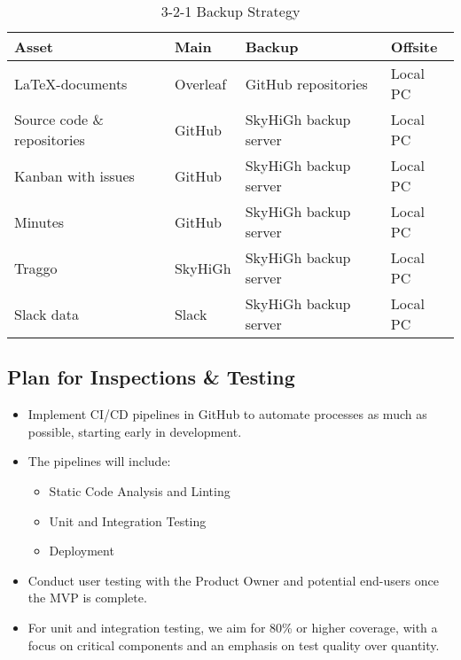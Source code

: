 \begin{table} [H]
    \centering
    \begin{tabular}{|l|l|l|l|}
    \hline
    Asset & Main & Backup & Offsite \\
    \hline
    \LaTeX-documents & Overleaf & GitHub repositories & Local PC \\
    Source code \& repositories & GitHub & SkyHiGh backup server & Local PC \\
    Kanban with issues & GitHub & SkyHiGh backup server & Local PC \\
    Minutes & GitHub & SkyHiGh backup server & Local PC \\
    Traggo & SkyHiGh & SkyHiGh backup server & Local PC \\
    Slack data & Slack & SkyHiGh backup server & Local PC \\
    \hline
    \end{tabular}
    \caption{3-2-1 Backup Strategy}
    \label{tab:tools}
\end{table}


\subsection{Plan for Inspections \& Testing}\label{sec:plan_for_inspections_&_testing}

\begin{itemize}
    \item Implement CI/CD pipelines in GitHub to automate processes as much as possible, starting early in development.
    \item The pipelines will include:
    \begin{itemize}
        \item Static Code Analysis and Linting
        \item Unit and Integration Testing
        \item Deployment
    \end{itemize}
    \item Conduct user testing with the Product Owner and potential end-users once the MVP is complete.
    \item For unit and integration testing, we aim for 80\% or higher coverage, with a focus on critical components and an emphasis on test quality over quantity.
\end{itemize}


